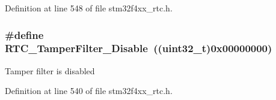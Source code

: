 Definition at line 548 of file stm32f4xx\-\_\-rtc.\-h.

\hypertarget{group___r_t_c___tamper___filter___definitions_ga606745baf6ebc29dec3ab8f4af69f9e7}{
\subsubsection[{R\-T\-C\-\_\-\-Tamper\-Filter\-\_\-\-Disable}]{\setlength{\rightskip}{0pt plus 5cm}\#define R\-T\-C\-\_\-\-Tamper\-Filter\-\_\-\-Disable~((uint32\-\_\-t)0x00000000)}}\label{group___r_t_c___tamper___filter___definitions_ga606745baf6ebc29dec3ab8f4af69f9e7}
Tamper filter is disabled 

Definition at line 540 of file stm32f4xx\-\_\-rtc.\-h.

